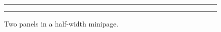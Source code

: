 \documentclass{article}
\begin{document}
\begin{minipage}{0.5\textwidth}
\begin{figure}[H]
  \centering
  \rule{0.45\linewidth}{1cm}\hfill\rule{0.45\linewidth}{1cm}
  \caption{Two panels in a half-width minipage.}
\end{figure}
\end{minipage}
\end{document}
